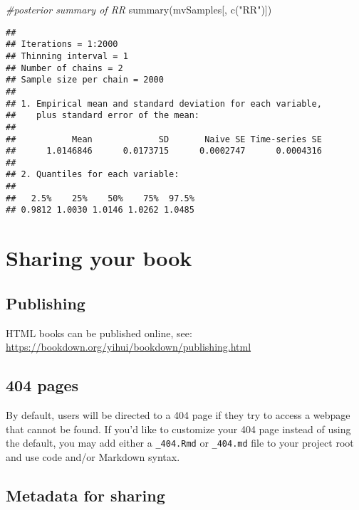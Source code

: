 \documentclass[
]{book}
\newenvironment{Shaded}{\begin{snugshade}}{\end{snugshade}}
\newcommand{\CommentTok}[1]{\textcolor[rgb]{0.56,0.35,0.01}{\textit{#1}}}
\newcommand{\FunctionTok}[1]{\textcolor[rgb]{0.00,0.00,0.00}{#1}}
\newcommand{\NormalTok}[1]{#1}
\newcommand{\StringTok}[1]{\textcolor[rgb]{0.31,0.60,0.02}{#1}}
\begin{document}
\begin{Shaded}
\begin{Highlighting}[]
\CommentTok{\#posterior summary of RR}
\FunctionTok{summary}\NormalTok{(mvSamples[, }\FunctionTok{c}\NormalTok{(}\StringTok{"RR"}\NormalTok{)])}
\end{Highlighting}
\end{Shaded}

\begin{verbatim}
## 
## Iterations = 1:2000
## Thinning interval = 1 
## Number of chains = 2 
## Sample size per chain = 2000 
## 
## 1. Empirical mean and standard deviation for each variable,
##    plus standard error of the mean:
## 
##           Mean             SD       Naive SE Time-series SE 
##      1.0146846      0.0173715      0.0002747      0.0004316 
## 
## 2. Quantiles for each variable:
## 
##   2.5%    25%    50%    75%  97.5% 
## 0.9812 1.0030 1.0146 1.0262 1.0485
\end{verbatim}

\hypertarget{sharing-your-book}{%
\chapter{Sharing your book}\label{sharing-your-book}}

\hypertarget{publishing}{%
\section{Publishing}\label{publishing}}

HTML books can be published online, see: \url{https://bookdown.org/yihui/bookdown/publishing.html}

\hypertarget{pages}{%
\section{404 pages}\label{pages}}

By default, users will be directed to a 404 page if they try to access a webpage that cannot be found. If you'd like to customize your 404 page instead of using the default, you may add either a \texttt{\_404.Rmd} or \texttt{\_404.md} file to your project root and use code and/or Markdown syntax.

\hypertarget{metadata-for-sharing}{%
\section{Metadata for sharing}\label{metadata-for-sharing}}
\end{document}
